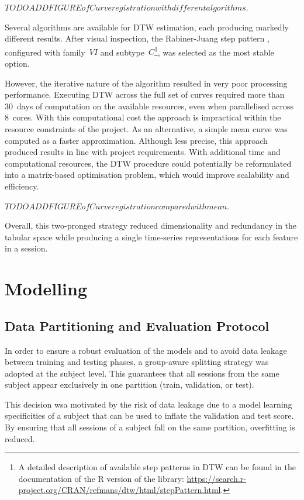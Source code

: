 $TODO ADD FIGURE of Curve registration with different algorithms.$

Several algorithms are available for DTW estimation, each producing markedly different results. After visual inspection, the Rabiner-Juang step pattern \citep{Rabiner1993}, configured with family~$VI$ and subtype~$C$\footnote{A detailed description of available step patterns in DTW can be found in the documentation of the R version of the library: \url{https://search.r-project.org/CRAN/refmans/dtw/html/stepPattern.html}.}, was selected as the most stable option.

However, the iterative nature of the algorithm resulted in very poor processing performance. Executing DTW across the full set of curves required more than 30~days of computation on the available resources, even when parallelised across 8~cores. With this computational cost the approach is impractical within the resource constraints of the project. As an alternative, a simple mean curve was computed as a faster approximation. Although less precise, this approach produced results in line with project requirements. With additional time and computational resources, the DTW procedure could potentially be reformulated into a matrix-based optimisation problem, which would improve scalability and efficiency.


$TODO ADD FIGURE of Curve registration compared with mean.$

Overall, this two-pronged strategy reduced dimensionality and redundancy in the tabular space while producing a single time-series representations for each feature in a session.


\section{Modelling}\label{sec:method-models}

\subsection{Data Partitioning and Evaluation Protocol}\label{subsec:method-eval-proto}
In order to ensure a robust evaluation of the models and to avoid data leakage between training and testing phases, a group-aware splitting strategy was adopted at the subject level. This guarantees that all sessions from the same subject appear exclusively in one partition (train, validation, or test).

This decision wsa motivated by the risk of data leakage due to a model learning specificities of a subject that can be used to inflate the validation and test score. By ensuring that all sessions of a subject fall on the same partition, overfitting is reduced.

